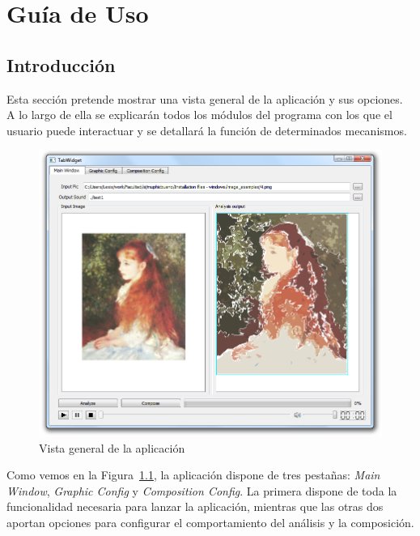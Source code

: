 \chapter{Guía de Uso}
\label{chap:guiauso}



	\section{Introducción}
		
		Esta sección pretende mostrar una vista general de la aplicación y sus opciones. A lo largo de ella se explicarán todos los módulos del programa con los que el usuario puede interactuar y se detallará la función de determinados mecanismos.\\
		
		\begin{figure}[htbp]
		\centering
		\hspace*{-0.3in}
		\includegraphics[scale=0.47]{graphics/interfazoverview.png}
		\caption{Vista general de la aplicación}
		\label{fig:interfazoverview}
		\end{figure}
		
		Como vemos en la Figura~\ref{fig:interfazoverview}, la aplicación dispone de tres pestañas: \emph{Main Window}, \emph{Graphic Config} y \emph{Composition Config}. La primera dispone de toda la funcionalidad necesaria para lanzar la aplicación, mientras que las otras dos aportan opciones para configurar el comportamiento del análisis y la composición.\\
		
